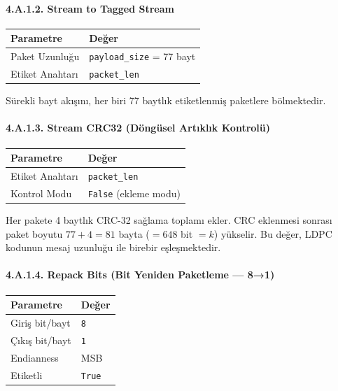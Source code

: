 \documentclass[
]{IEEEtran}
\newcounter{none} %
\begin{document}
\paragraph{4.A.1.2. Stream to Tagged
Stream}\label{a.1.2.-stream-to-tagged-stream}

{\def\LTcaptype{none} %
\begin{longtable}[]{@{}ll@{}}
\toprule\noalign{}
Parametre & Değer \\
\midrule\noalign{}
\endhead
\bottomrule\noalign{}
\endlastfoot
Paket Uzunluğu & \texttt{payload\_size} = 77 bayt \\
Etiket Anahtarı & \texttt{packet\_len} \\
\end{longtable}
}

Sürekli bayt akışını, her biri 77 baytlık etiketlenmiş paketlere
bölmektedir.

\paragraph{4.A.1.3. Stream CRC32 (Döngüsel Artıklık
Kontrolü)}\label{a.1.3.-stream-crc32-duxf6nguxfcsel-artux131klux131k-kontroluxfc}

{\def\LTcaptype{none} %
\begin{longtable}[]{@{}ll@{}}
\toprule\noalign{}
Parametre & Değer \\
\midrule\noalign{}
\endhead
\bottomrule\noalign{}
\endlastfoot
Etiket Anahtarı & \texttt{packet\_len} \\
Kontrol Modu & \texttt{False} (ekleme modu) \\
\end{longtable}
}

Her pakete 4 baytlık CRC-32 sağlama toplamı ekler. CRC eklenmesi sonrası
paket boyutu \(77 + 4 = 81\) bayta (\(= 648\) bit \(= k\)) yükselir. Bu
değer, LDPC kodunun mesaj uzunluğu ile birebir eşleşmektedir.

\paragraph{4.A.1.4. Repack Bits (Bit Yeniden Paketleme ---
8→1)}\label{a.1.4.-repack-bits-bit-yeniden-paketleme-81}

{\def\LTcaptype{none} %
\begin{longtable}[]{@{}ll@{}}
\toprule\noalign{}
Parametre & Değer \\
\midrule\noalign{}
\endhead
\bottomrule\noalign{}
\endlastfoot
Giriş bit/bayt & \texttt{8} \\
Çıkış bit/bayt & \texttt{1} \\
Endianness & MSB \\
Etiketli & \texttt{True} \\
\end{longtable}
}
\end{document}

